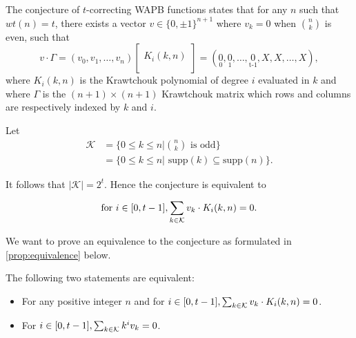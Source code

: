 The conjecture of $t$-correcting WAPB functions states that for any $n$ such that $wt(n) = t$, there exists a vector $v \in \{0, \pm 1\}^{n+1}$ where $v_k = 0$ when $\binom{n}{k}$ is even, such that
$$
v \cdot \Gamma = (v_0, v_1, \ldots, v_n)
\begin{bmatrix}
    \\
    K_i(k, n) \\
    \\
\end{bmatrix} = (\underset{\operatorname{0}}{0}, \underset{\operatorname{1}}{0}, \ldots, \underset{\operatorname{t - 1}}{0}, X, X, \ldots, X),
$$
where $K_i(k,n)$ is the Krawtchouk polynomial of degree $i$ evaluated in $k$ and where $\Gamma$ is the $(n+1) \times (n + 1)$ Krawtchouk matrix which rows and columns are respectively indexed by $k$ and $i$.

Let
\begin{equation*}
\begin{split}
    \mathcal{K} &= \{0 \leq k \leq n | \binom{n}{k} \text{ is odd}\}\\
    &=\{0 \leq k \leq n | \text{ supp}(k) \subseteq \text{supp}(n)\}.
\end{split}
\end{equation*}

It follows that $|\mathcal{K}| = 2^t$. Hence the conjecture is equivalent to

\begin{equation}\label{eq:statement}
    \text{for } i \in [0, t-1], \sum_{k \in \mathcal{K}} v_k \cdot K_i(k, n) = 0.
\end{equation}

We want to prove an equivalence to the conjecture as formulated in \cref{prop:equivalence} below.
\begin{proposition}\label{prop:equivalence}
    The following two statements are equivalent:
    \begin{itemize}
        \item For any positive integer $n$ and for $i \in [0, t-1], \sum_{k \in \mathcal{K}} v_k \cdot K_i(k, n) = 0$.
        \item For $i \in [0,t-1], \sum_{k \in \mathcal{K}} k^iv_k= 0$.
    \end{itemize}
\end{proposition}

